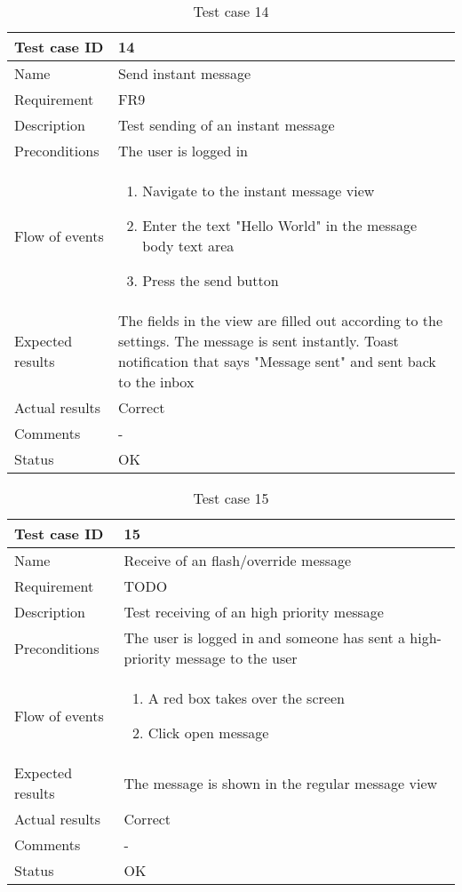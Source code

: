 		\begin{table}[htb]
			\begin{tabular}{l|p{10cm}}
				Test case ID & 14 \\ \hline
				Name & Send instant message\\ \hline
				Requirement & FR9\\ \hline
				Description & Test sending of an instant message\\ \hline
				Preconditions & The user is logged in\\ \hline
				Flow of events & 
					\begin{enumerate}
						\item{}Navigate to the instant message view
						\item{}Enter the text "Hello World" in the message body text area
						\item{}Press the send button
					\end{enumerate} \\ \hline
				Expected results & The fields in the view are filled out according to the settings. The message is sent instantly. Toast notification that says "Message sent" and sent back to the inbox \\ \hline
				Actual results & Correct\\ \hline
				Comments &-\\ \hline
				Status &OK \\ \hline
			\end{tabular}
			\caption{Test case 14} \label{tab:case14}
		\end{table}

		\begin{table}[htb]
			\begin{tabular}{l|p{10cm}}
				Test case ID & 15 \\ \hline
				Name & Receive of an flash/override message\\ \hline
				Requirement & TODO\\ \hline
				Description & Test receiving of an high priority message\\ \hline
				Preconditions & The user is logged in and someone has sent a high-priority message to the user\\ \hline
				Flow of events & 
					\begin{enumerate}
						\item{}A red box takes over the screen
						\item{}Click open message
					\end{enumerate} \\ \hline
				Expected results & The message is shown in the regular message view\\ \hline
				Actual results & Correct\\ \hline
				Comments & -\\ \hline
				Status & OK \\ \hline
			\end{tabular}
			\caption{Test case 15} \label{tab:case15}
		\end{table}

